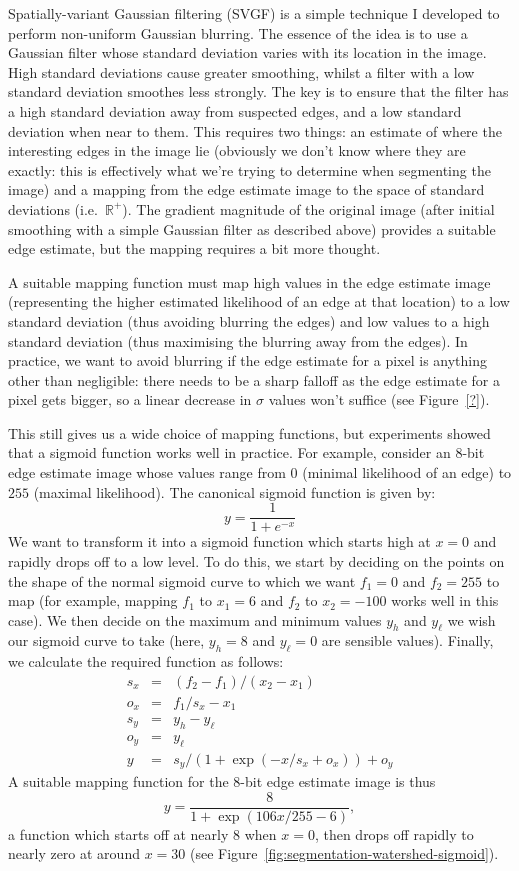 Spatially-variant Gaussian filtering (SVGF) is a simple technique I developed to perform non-uniform Gaussian blurring. The essence of the idea is to use a Gaussian filter whose standard deviation varies with its location in the image. High standard deviations cause greater smoothing, whilst a filter with a low standard deviation smoothes less strongly. The key is to ensure that the filter has a high standard deviation away from suspected edges, and a low standard deviation when near to them. This requires two things: an estimate of where the interesting edges in the image lie (obviously we don't know where they are exactly: this is effectively what we're trying to determine when segmenting the image) and a mapping from the edge estimate image to the space of standard deviations (i.e.~$\mathbb{R}^+$). The gradient magnitude of the original image (after initial smoothing with a simple Gaussian filter as described above) provides a suitable edge estimate, but the mapping requires a bit more thought.

A suitable mapping function must map high values in the edge estimate image (representing the higher estimated likelihood of an edge at that location) to a low standard deviation (thus avoiding blurring the edges) and low values to a high standard deviation (thus maximising the blurring away from the edges). In practice, we want to avoid blurring if the edge estimate for a pixel is anything other than negligible: there needs to be a sharp falloff as the edge estimate for a pixel gets bigger, so a linear decrease in $\sigma$ values won't suffice (see Figure~\ref{?}).


This still gives us a wide choice of mapping functions, but experiments showed that a sigmoid function works well in practice. For example, consider an 8-bit edge estimate image whose values range from $0$ (minimal likelihood of an edge) to $255$ (maximal likelihood). The canonical sigmoid function is given by:
%
\[
y = \frac{1}{1 + e^{-x}}
\]
%
We want to transform it into a sigmoid function which starts high at $x = 0$ and rapidly drops off to a low level. To do this, we start by deciding on the points on the shape of the normal sigmoid curve to which we want $f_1 = 0$ and $f_2 = 255$ to map (for example, mapping $f_1$ to $x_1 = 6$ and $f_2$ to $x_2 = -100$ works well in this case). We then decide on the maximum and minimum values $y_h$ and $y_\ell$ we wish our sigmoid curve to take (here, $y_h = 8$ and $y_\ell = 0$ are sensible values). Finally, we calculate the required function as follows:
%
\begin{eqnarray*}
s_x & = & (f_2 - f_1)/(x_2 - x_1) \\
o_x & = & f_1/s_x - x_1 \\
s_y & = & y_h - y_\ell \\
o_y & = & y_\ell \\
y & = & s_y/(1 + \exp(-x/s_x + o_x)) + o_y
\end{eqnarray*}
%
A suitable mapping function for the 8-bit edge estimate image is thus
%
\[
y = \frac{8}{1 + \exp(106x/255 - 6)},
\]
%
a function which starts off at nearly $8$ when $x = 0$, then drops off rapidly to nearly zero at around $x = 30$ (see Figure~\ref{fig:segmentation-watershed-sigmoid}).

